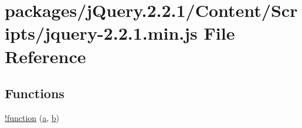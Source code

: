 \hypertarget{jquery-2_82_81_8min_8js}{}\section{packages/j\+Query.2.2.1/\+Content/\+Scripts/jquery-\/2.2.1.min.\+js File Reference}
\label{jquery-2_82_81_8min_8js}
\subsection*{Functions}
\begin{DoxyCompactItemize}
\item 
\hyperlink{jquery-2_82_81_8min_8js_a43f0b96ea8ec44ca20ba86809a785614}{!function} (\hyperlink{_shame_the_thrones_2_scripts_2js_2thirdparty_2bootstrap_8min_8js_a1f5870dcf487187f13d5fd328ed9e6e7}{a}, \hyperlink{_shame_the_thrones_2_scripts_2js_2thirdparty_2bootstrap_8min_8js_a398bb8542498d1b14178b02b99df309b}{b})
\item 

\end{DoxyCompactItemize}
